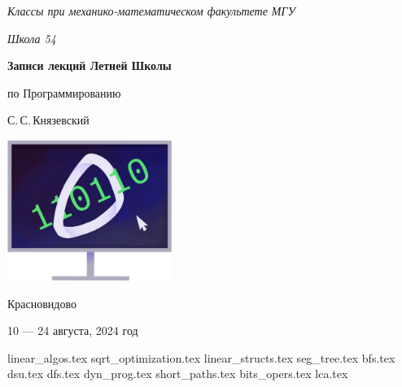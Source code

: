 \documentclass[a5paper, 10pt, twoside]{article}
\begin{document}
\begin{titlepage}
    \centering
    \vspace*{\fill}
    
    {\sl\large Классы при механико-математическом факультете МГУ} \medskip

    {\sl\large Школа 54}

    \vspace*{4cm}

    \begin{spacing}{1}
        \LARGE\bfseries Записи лекций Летней Школы\par по Программированию
    \end{spacing}
    \smallskip
    
    {\Large С.\,С.\,Князевский}
    \vspace{.6cm}
    
    \includegraphics[width=0.4\textwidth]{img/logo.jpg}

    \vspace*{4cm}

    {\large Красновидово}\medskip
    
    {\large 10 --- 24 августа, 2024 год}
    \vspace*{\fill}
\end{titlepage}

\tableofcontents
\newpage

{linear_algos.tex}
{sqrt_optimization.tex}
{linear_structs.tex}
{seg_tree.tex}
{bfs.tex}
{dsu.tex}
{dfs.tex}
{dyn_prog.tex}
{short_paths.tex}
{bits_opers.tex}
{lca.tex}
\end{document}
